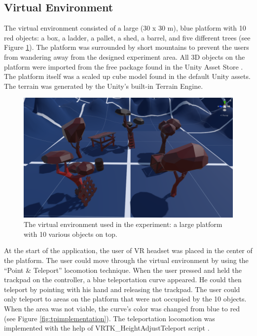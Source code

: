 \subsection{Virtual Environment}

The virtual environment consisted of a large (30 x 30 m), blue platform with 10 red objects: a box, a ladder, a pallet, a shed, a barrel, and five different trees (see Figure \ref{fig:veimplementation}). The platform was surrounded by short mountains to prevent the users from wandering away from the designed experiment area. All 3D objects on the platform were imported from the free package found in the Unity Asset Store \cite{POLYGONCITY}. The platform itself was a scaled up cube model found in the default Unity assets. The terrain was generated by the Unity's built-in Terrain Engine.

\begin{figure}[th]
\centering
\includegraphics[width=1\textwidth]{img/virtual_environment.png}
\caption{The virtual environment used in the experiment: a large platform with 10 various objects on top.}
\label{fig:veimplementation}
\end{figure}

At the start of the application, the user of VR headset was placed in the center of the platform. The user could move through the virtual environment by using the ``Point \& Teleport'' locomotion technique. When the user pressed and held the trackpad on the controller, a blue teleportation curve appeared. He could then teleport by pointing with his hand and releasing the trackpad. The user could only teleport to areas on the platform that were not occupied by the 10 objects. When the area was not viable, the curve's color was changed from blue to red (see Figure \ref{fig:tpimplementation}). The teleportation locomotion was implemented with the help of VRTK\_HeightAdjustTeleport script \cite{VRTK_TELEPORT}.

